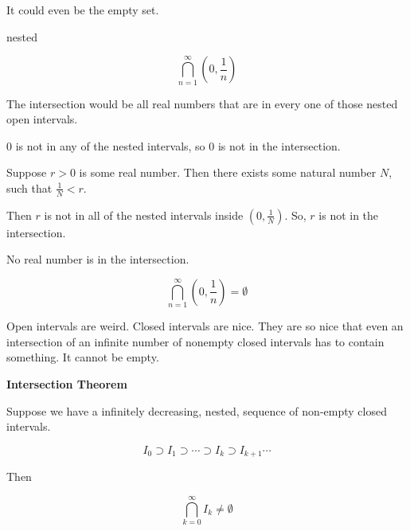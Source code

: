 \documentclass{ximera}
\begin{document}
It could even be the empty set.



\begin{example} nested


\[ \bigcap_{n=1}^{\infty}   \left(0,  \frac{1}{n}\right)     \]



The intersection would be all real numbers that are in every one of those nested open intervals.


$0$ is not in any of the nested intervals, so $0$ is not in the intersection.


Suppose $r>0$ is some real number.  Then there exists some natural number $N$, such that $\frac{1}{N} < r$.

Then $r$ is not in all of the nested intervals inside $\left(0,  \frac{1}{N}\right)$. So, $r$ is not in the intersection.


No real number is in the intersection.


\[ \bigcap_{n=1}^{\infty}   \left(0,  \frac{1}{n}\right)  = \emptyset    \]



\end{example}










Open intervals are weird.  Closed intervals are nice.  They are so nice that even an intersection of an infinite number of nonempty closed intervals has to contain something.  It cannot be empty.




\begin{theorem} \textbf{\textcolor{blue!75!black}{Intersection Theorem}}  


Suppose we have a infinitely decreasing, nested, sequence of non-empty closed intervals.


\[   I_0 \supset    I_1 \supset  \cdots \supset I_{k}   \supset I_{k+1}  \cdots  \]



Then 


\[   \bigcap_{k=0}^{\infty} I_{k} \ne \emptyset         \]


\end{theorem}
\end{document}

